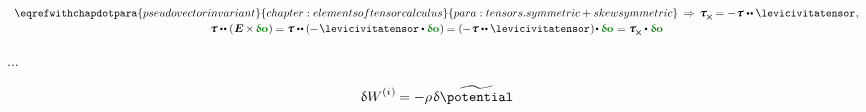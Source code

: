 \nopagebreak\vspace{-0.8em}\begin{equation*}
\begin{array}{c}
\eqrefwithchapdotpara{pseudovectorinvariant}{chapter:elementsoftensorcalculus}{para:tensors.symmetric+skewsymmetric} \:\Rightarrow\,
\cauchystress_{\hspace{-0.1ex}\Xcompanion} \hspace{-0.1ex} = - \hspace{.1ex} \cauchystress \hspace{.1ex} \dotdotp \levicivitatensor
\hspace{.1ex} ,
\\[.2em]
%
\cauchystress \dotdotp \hspace{-0.32ex} \left( \hspace{.1ex} \UnitDyad \hspace{-0.16ex} \times \hspace{-0.2ex} \constvarvector{o} \hspace{.1ex} \right) \hspace{-0.1ex}
= \cauchystress \dotdotp \hspace{-0.4ex} \left( \hspace{-0.1ex} - \hspace{.2ex} \levicivitatensor \dotp \constvarvector{o} \hspace{.1ex} \right) \hspace{-0.1ex}
= \left( \hspace{-0.1ex} - \hspace{.1ex} \cauchystress \dotdotp \levicivitatensor \hspace{.1ex} \right) \hspace{-0.3ex} \dotp \constvarvector{o} \hspace{.1ex}
= \cauchystress_{\hspace{-0.1ex}\Xcompanion} \dotp \hspace{.1ex} \constvarvector{o}
\end{array}
\end{equation*}

...

 

\nopagebreak\vspace{-0.2em}\begin{equation*}
\variation{\internalwork} = - \rho \hspace{.2ex} \variation{\widetilde{\potential}}
\end{equation*}

